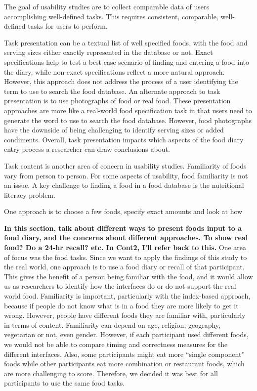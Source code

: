 The goal of usability studies are to collect comparable data of users accomplishing well-defined tasks. This requires consistent, comparable, well-defined tasks for users to perform.  

Task presentation can be a textual list of well specified foods, with the food and serving sizes either exactly represented in the database or not. Exact specifications help to test a best-case scenario of finding and entering a food into the diary, while non-exact specifications reflect a more natural approach. However, this approach does not address the process of a user identifying the term to use to search the food database. An alternate approach to task presentation is to use photographs of food or real food. These presentation approaches are more like a real-world food specification task in that users need to generate the word to use to search the food database. However, food photographs have the downside of being challenging to identify serving sizes or added condiments. Overall, task presentation impacts which aspects of the food diary entry process a researcher can draw conclusions about. 

Task content is another area of concern in usability studies. Familiarity of foods vary from person to person. For some aspects of usability, food familiarity is not an issue.    A key challenge to finding a food in a food database is the nutritional literacy problem. 

One approach is to choose a few foods, specify exact amounts and look at how 

\textbf{In this section, talk about different ways to present foods input to a food diary, and the concerns about different approaches. To show real food? Do a 24-hr recall? etc. In Cont2, I'll refer back to this. }
One area of focus was the food tasks. Since we want to apply the findings of this study to the real world, one approach is to use a food diary or recall of that participant. This gives the benefit of a person being familiar with the food, and it would allow us as researchers to identify how the interfaces do or do not support the real world food. Familiarity is important, particularly with the index-based approach, because if people do not know what is in a food they are more likely to get it wrong. However, people have different foods they are familiar with, particularly in terms of content. Familiarity can depend on age, religion, geography, vegetarian or not, even gender. However, if each participant used different foods, we would not be able to compare timing and correctness measures for the different interfaces. Also, some participants might eat more ``single component'' foods while other participants eat more combination or restaurant foods, which are more challenging to score. Therefore, we decided it was best for all participants to use the same food tasks. 


